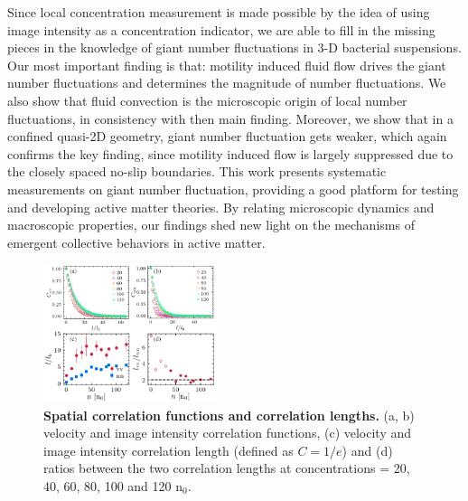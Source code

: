 \documentclass[twocolumn,aps,prl,amsmath,amssymb,longbibliography]{revtex4-2}
\begin{document}
Since local concentration measurement is made possible by the idea of using image intensity as a concentration indicator, we are able to fill in the missing pieces in the knowledge of giant number fluctuations in 3-D bacterial suspensions. Our most important finding is that: motility induced fluid flow drives the giant number fluctuations and determines the magnitude of number fluctuations. We also show that fluid convection is the microscopic origin of local number fluctuations, in consistency with then main finding. Moreover, we show that in a confined quasi-2D geometry, giant number fluctuation gets weaker, which again confirms the key finding, since motility induced flow is largely suppressed due to the closely spaced no-slip boundaries. This work presents systematic measurements on giant number fluctuation, providing a good platform for testing and developing active matter theories. By relating microscopic dynamics and macroscopic properties, our findings shed new light on the mechanisms of emergent collective behaviors in active matter.


\begin{figure}[!]
\begin{center}
\includegraphics[width=0.45\textwidth]{figures/fig-2-v2.PNG}
\caption[]{\textbf{Spatial correlation functions and correlation lengths.} (a, b) velocity and image intensity correlation functions, (c) velocity and image intensity correlation length (defined as $C=1/e$) and (d) ratios between the two correlation lengths at concentrations = 20, 40, 60, 80, 100 and 120 n$_0$.}
\label{fig:2}
\end{center}
\end{figure}
\end{document}
